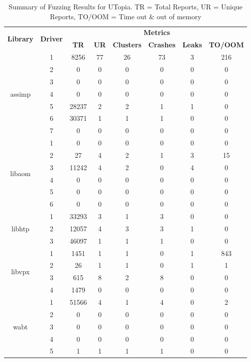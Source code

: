 \documentclass[a4paper,11pt,oneside]{report}
\begin{document}
\begin{table}[h]
  \centering
  \label{tab:crashes_utopia}
  \caption{Summary of Fuzzing Results for UTopia. TR = Total Reports, UR = Unique Reports, TO/OOM = Time out \& out of memory}
  \begin{tabular}{|c|c|c|c|c|c|c|c|}
    \hline
    \multirow{2}{*}{\textbf{Library}} & \multirow{2}{*}{\textbf{Driver}} & \multicolumn{6}{c|}{\textbf{Metrics}} \\
    \cline{3-8}
     &  & \textbf{TR} & \textbf{UR} & \textbf{Clusters} & \textbf{Crashes} & \textbf{Leaks} & \textbf{TO/OOM} \\
    \hline
    \multirow{7}{*}{assimp} & 1 & 8256 & 77 & 26 & 73 & 3 & 216 \\
     & 2 & 0 & 0 & 0 & 0 & 0 & 0 \\
     & 3 & 0 & 0 & 0 & 0 & 0 & 0 \\
     & 4 & 0 & 0 & 0 & 0 & 0 & 0 \\
     & 5 & 28237 & 2 & 2 & 1 & 1 & 0 \\
     & 6 & 30371 & 1 & 1 & 1 & 0 & 0 \\
     & 7 & 0 & 0 & 0 & 0 & 0 & 0 \\
    \hline
    \multirow{6}{*}{libaom} & 1 & 0 & 0 & 0 & 0 & 0 & 0 \\
     & 2 & 27 & 4 & 2 & 1 & 3 & 15 \\
     & 3 & 11242 & 4 & 2 & 0 & 4 & 0 \\
     & 4 & 0 & 0 & 0 & 0 & 0 & 0 \\
     & 5 & 0 & 0 & 0 & 0 & 0 & 0 \\
     & 6 & 0 & 0 & 0 & 0 & 0 & 0 \\
    \hline
    \multirow{3}{*}{libhtp} & 1 & 33293 & 3 & 1 & 3 & 0 & 0 \\
     & 2 & 12057 & 4 & 3 & 3 & 1 & 0 \\
     & 3 & 46097 & 1 & 1 & 1 & 0 & 0 \\
    \hline
    \multirow{4}{*}{libvpx} & 1 & 1451 & 1 & 1 & 0 & 1 & 843 \\
     & 2 & 26 & 1 & 1 & 0 & 1 & 1 \\
     & 3 & 615 & 8 & 2 & 8 & 0 & 0 \\
     & 4 & 1479 & 0 & 0 & 0 & 0 & 0 \\
    \hline
    \multirow{5}{*}{wabt} & 1 & 51566 & 4 & 1 & 4 & 0 & 2 \\
     & 2 & 0 & 0 & 0 & 0 & 0 & 0 \\
     & 3 & 0 & 0 & 0 & 0 & 0 & 0 \\
     & 4 & 0 & 0 & 0 & 0 & 0 & 0 \\
     & 5 & 1 & 1 & 1 & 1 & 0 & 0 \\
    \hline
  \end{tabular}
\end{table}
\end{document}
